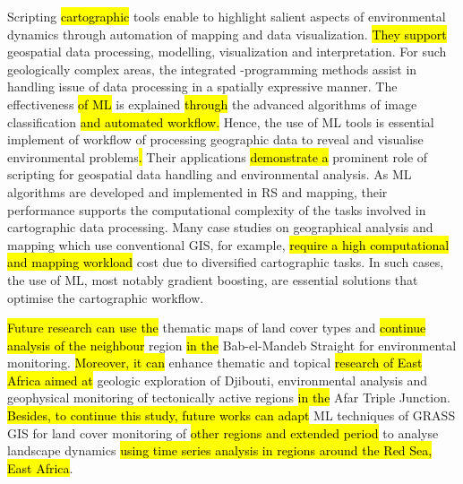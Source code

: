 \documentclass[jimaging,article,submit,pdftex,moreauthors]{Definitions/mdpi}
\begin{document}
Scripting \hl{cartographic} tools\hl{ }enable to highlight salient aspects of environmental dynamics through automation of mapping and data visualization. \hl{They support} geospatial data processing, modelling, visualization and interpretation. For such geologically complex areas, the integrated -programming methods assist in handling issue of data processing in a spatially expressive manner. The\hl{ }effectiveness \hl{of ML }is explained \hl{through } the advanced algorithms of\hl{ }image classification \hl{and automated workflow. }Hence, the use of ML tools is essential implement of workflow of processing geographic data to reveal and visualise environmental problems\hl{. }Their applications \hl{demonstrate a} prominent role of\hl{ }scripting for geospatial data handling\hl{ }and\hl{ }environmental analysis. As ML algorithms are developed and implemented in RS and mapping, their performance supports the computational complexity of the tasks involved in cartographic data processing. Many case studies on geographical analysis and mapping which use conventional GIS, for example, \hl{require a high computational and mapping workload} cost due to diversified cartographic tasks. In such cases, the use of\hl{ }ML, most notably gradient boosting, are essential solutions that optimise the cartographic workflow. 

\hl{Future research can use the }thematic maps of land cover types and \hl{continue analysis of the neighbour} region \hl{in the} Bab-el-Mandeb Straight\hl{ }for environmental monitoring. \hl{Moreover, it can} enhance thematic and topical \hl{research of East Africa aimed at} geologic exploration of Djibouti, environmental analysis and geophysical monitoring of tectonically active regions \hl{in the} Afar Triple Junction. \hl{Besides, to continue this study, future works can adapt }ML techniques of GRASS GIS\hl{ }for land cover monitoring of \hl{other regions and extended period }to analyse landscape dynamics \hl{using time series analysis in regions around the Red Sea, East Africa}. 


\end{document}
